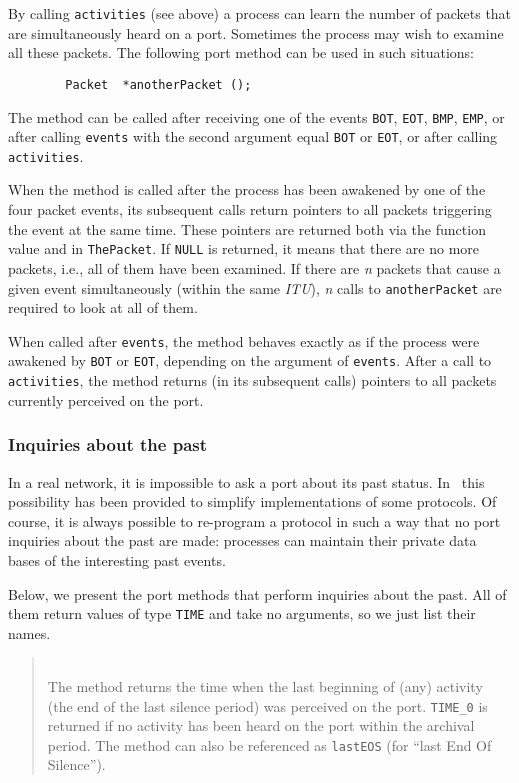 By calling {\tt activities} (see above) a process can learn the number of
packets that are simultaneously heard on a port.
Sometimes the process may wish to examine all these packets.
The following port method can be used in such situations:
\begin{verbatim}
        Packet  *anotherPacket ();
\end{verbatim}
The method can be called after receiving one of the events {\tt BOT},
{\tt EOT}, {\tt BMP}, {\tt EMP}, or after calling
{\tt events} with the second argument equal {\tt BOT} or {\tt EOT}, or
after calling {\tt activities}.

When the method is called after the process has been awakened by one of the
four packet events,
its subsequent calls return pointers to all packets
triggering the event at the same time.
These pointers are returned both via the function
value and in {\tt ThePacket}.
If {\tt NULL} is returned, it
means that there are no more packets, i.e.,
all of them have been examined.
If there are {\em n\/} packets that cause a given event simultaneously
(within the same {\em ITU\/}), {\em n\/} calls
to {\tt anotherPacket} are required to look at all of them.

When called after {\tt events}, the method behaves exactly as if
the process were awakened by {\tt BOT} or {\tt EOT}, depending on the
argument of {\tt events}.
After a call to
{\tt activities}, the method returns (in its subsequent calls)
pointers to all packets currently perceived on the port.

\subsubsection{Inquiries about the past}
\label{rm_po_in_pa}

In a real network, it is impossible to ask a port about its past status.
In \smurph\ this possibility has been provided to simplify implementations
of some protocols.
Of course, it is always possible to re-program a protocol in such a way
that no port inquiries about the past are made: processes can maintain their
private data bases of the interesting past events.

Below, we present the port methods that perform inquiries about the past.
All of them return values of type {\tt TIME} and take no arguments, so we
just list their names.


\medskip

\begin{quote}
\noindent{}\\ \hspace{0in}
The method returns the time when the last beginning of (any) activity
(the end of the last silence period) was perceived on the
port.
{\tt TIME\_0} is returned
if no activity has been heard on the port within the archival period.
The method can also be referenced as {\tt lastEOS} (for ``last End Of
Silence'').
\end{quote}

